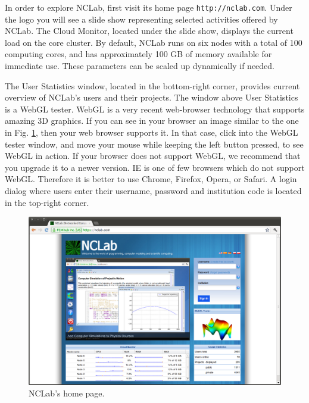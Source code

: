 \documentclass[article,A4,12pt]{llncs}
\begin{document}
In order to explore NCLab, first visit its home page {\tt http://nclab.com}.
Under the logo you will see a slide show representing selected activities 
offered by NCLab. The Cloud Monitor, located under the slide show, displays 
the current load on the core cluster. By default, NCLab runs on six nodes 
with a total of 100 computing cores, and has approximately 100 GB of memory 
available for immediate use. These parameters can be scaled up dynamically 
if needed. 

The User Statistics window, located in the 
bottom-right corner, provides current overview of NCLab's users and their projects. 
The window above User Statistics is a WebGL tester. WebGL is a very recent 
web-browser technology that supports amazing 3D graphics. If you can see in your 
browser an image similar to the one in Fig. \ref{fig:outside}, then your web 
browser supports it. In that case, click into the WebGL tester window, and move 
your mouse while keeping the left button pressed, to see WebGL in action.
If your browser does not support WebGL, we recommend that you 
upgrade it to a newer version. IE is one of few browsers which do not support WebGL. Therefore 
it is better to use Chrome, Firefox, Opera, or Safari. A login dialog where
users enter their username, password and institution code is located in the 
top-right corner.\\[-8mm]

\begin{figure}[!ht]
\begin{center}
\includegraphics[width=\textwidth]{img/outside.png}
\end{center}
\vspace{-2mm}
\caption{NCLab's home page.}
\label{fig:outside}
\vspace{-0.6cm}
\end{figure}
\end{document}
